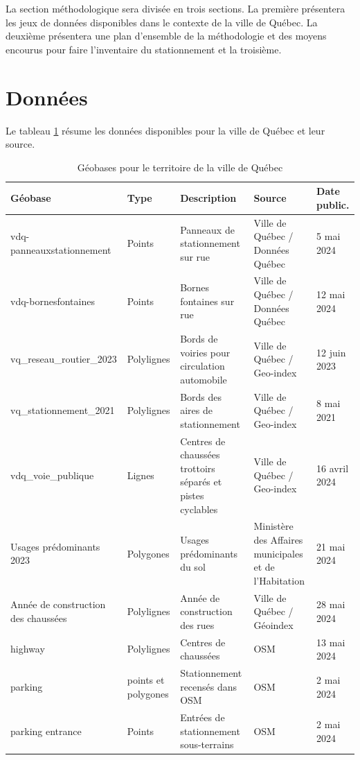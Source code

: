 \label{sec:Methodologie}


La section méthodologique sera divisée en trois sections. La première présentera les jeux de données disponibles dans le contexte de la ville de Québec. La deuxième présentera une plan d'ensemble de la méthodologie et des moyens encourus pour faire l'inventaire du stationnement et la troisième.


\section{Données}
Le tableau \ref{tab:donnees_disponibles_Québec} résume les données disponibles pour la ville de Québec et leur source.
\begin{landscape}
\begin{table}[h!]
  \centering
   \begin{tabular}{l l p{.3 \linewidth} p{.15\linewidth} l } 
   \hline
   Géobase & Type & Description  & Source & Date public.\\ 
   \hline
   vdq-panneauxstationnement    & Points        & Panneaux de stationnement sur rue          & Ville de Québec / Données Québec  & 5 mai 2024 \\
   \hline
   vdq-bornesfontaines          & Points        & Bornes fontaines sur rue                   & Ville de Québec / Données Québec & 12 mai 2024 \\
   \hline
   vq\_reseau\_routier\_2023 & Polylignes    & Bords de voiries pour circulation automobile  & Ville de Québec / Geo-index  & 12 juin 2023\\ 
   \hline
   vq\_stationnement\_2021  & Polylignes    & Bords des aires de stationnement           & Ville de Québec / Geo-index & 8 mai 2021\\
   \hline
   vdq\_voie\_publique            & Lignes        & Centres de chaussées trottoirs séparés et pistes cyclables & Ville de Québec / Geo-index & 16 avril 2024 \\
   \hline
   Usages prédominants 2023  & Polygones & Usages prédominants du sol &   Ministère des Affaires municipales et de l'Habitation & 21 mai 2024 \\
   \hline
   Année de construction des chaussées & Polylignes & Année de construction des rues & Ville de Québec / Géoindex & 28 mai 2024 \\
   \hline
   highway & Polylignes & Centres de chaussées & \ac{OSM} & 13 mai 2024\\
   \hline
   parking & points et polygones & Stationnement recensés dans \ac{OSM} & \ac{OSM} & 2 mai 2024 \\
   \hline
    parking entrance & Points & Entrées de stationnement sous-terrains  & \ac{OSM} & 2 mai 2024 \\
    \hline
   \end{tabular}
   \caption{Géobases pour le territoire de la ville de Québec}
   \label{tab:donnees_disponibles_Québec}
\end{table}


\end{landscape}
